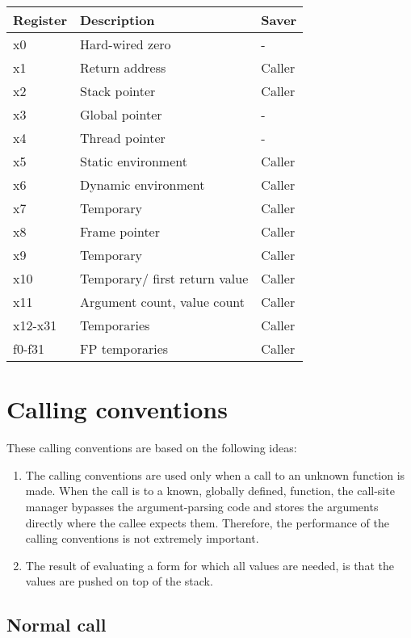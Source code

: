 {\small
\begin{tabular}{|l|l|l|}
  \hline
  Register & Description & Saver\\
  \hline
  \hline
  x0 & Hard-wired zero & -\\
  x1 & Return address & Caller\\
  x2 & Stack pointer & Caller\\
  x3 & Global pointer & -\\
  x4 & Thread pointer & -\\
  x5 & Static environment & Caller\\
  x6 & Dynamic environment & Caller\\
  x7 & Temporary & Caller\\
  x8 & Frame pointer & Caller\\
  x9 & Temporary & Caller\\
  x10 & Temporary/ first return value & Caller\\
  x11 & Argument count, value count & Caller\\
  x12-x31 & Temporaries & Caller\\
  \hline
  f0-f31 & FP temporaries & Caller\\
  \hline
\end{tabular}}

\section{Calling conventions}
\label{sec-backend-risc-v-calling-conventions}

These calling conventions are based on the following ideas:

\begin{enumerate}
\item The calling conventions are used only when a call to an unknown
  function is made.  When the call is to a known, globally defined,
  function, the call-site manager bypasses the argument-parsing code
  and stores the arguments directly where the callee expects them.
  Therefore, the performance of the calling conventions is not
  extremely important.
\item The result of evaluating a form for which all values are needed,
  is that the values are pushed on top of the stack.
\end{enumerate}

\subsection{Normal call}

